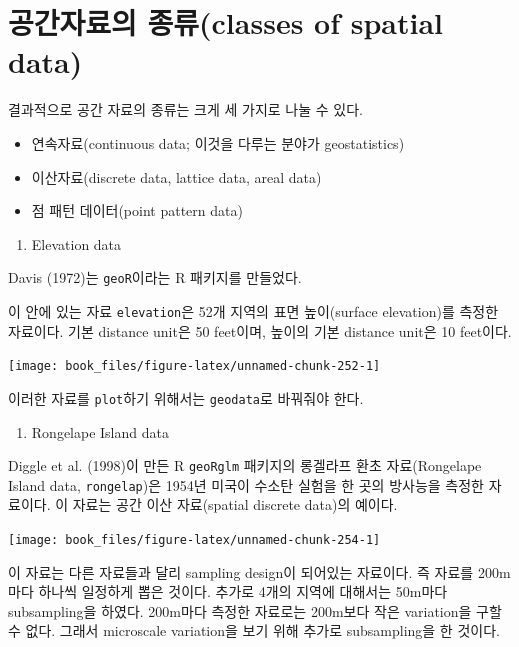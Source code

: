 \documentclass[b5paper,]{scrbook}
\providecommand{\tightlist}{%
  \setlength{\itemsep}{0pt}\setlength{\parskip}{0pt}}
\theoremstyle{plain}
\theoremstyle{definition}
\numberwithin{equation}{section}
\begin{document}
\section{공간자료의 종류(classes of spatial
data)}\label{-classes-of-spatial-data}

결과적으로 공간 자료의 종류는 크게 세 가지로 나눌 수 있다.

\begin{itemize}
\item
  연속자료(continuous data; 이것을 다루는 분야가 geostatistics)
\item
  이산자료(discrete data, lattice data, areal data)
\item
  점 패턴 데이터(point pattern data)
\end{itemize}

\begin{enumerate}
\def\labelenumi{\arabic{enumi}.}
\tightlist
\item
  Elevation data
\end{enumerate}

Davis (1972)는 \texttt{geoR}이라는 R 패키지를 만들었다.

이 안에 있는 자료 \texttt{elevation}은 52개 지역의 표면 높이(surface
elevation)를 측정한 자료이다. 기본 distance unit은 50 feet이며, 높이의
기본 distance unit은 10 feet이다.

\begin{center}\texttt{[image: book\_files/figure-latex/unnamed-chunk-252-1]} \end{center}

이러한 자료를 \texttt{plot}하기 위해서는 \texttt{geodata}로 바꿔줘야
한다.

\begin{enumerate}
\def\labelenumi{\arabic{enumi}.}
\setcounter{enumi}{1}
\tightlist
\item
  Rongelape Island data
\end{enumerate}

Diggle et al. (1998)이 만든 R \texttt{geoRglm} 패키지의 롱겔라프 환초
자료(Rongelape Island data, \texttt{rongelap})은 1954년 미국이 수소탄
실험을 한 곳의 방사능을 측정한 자료이다. 이 자료는 공간 이산
자료(spatial discrete data)의 예이다.

\begin{center}\texttt{[image: book\_files/figure-latex/unnamed-chunk-254-1]} \end{center}

이 자료는 다른 자료들과 달리 sampling design이 되어있는 자료이다. 즉
자료를 200m마다 하나씩 일정하게 뽑은 것이다. 추가로 4개의 지역에
대해서는 50m마다 subsampling을 하였다. 200m마다 측정한 자료로는 200m보다
작은 variation을 구할 수 없다. 그래서 microscale variation을 보기 위해
추가로 subsampling을 한 것이다.
\end{document}
